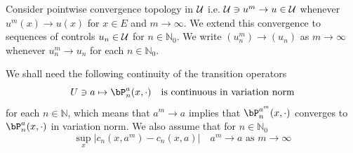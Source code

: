\documentclass[10pt,english]{extarticle}
\begin{document}
Consider pointwise convergence topology in ${\cal U}$ i.e. ${\cal U} \ni u^m \to u\in {\cal U}$ whenever $u^m(x)\to u(x)$ for $x\in E$ and $m\to \infty$. We extend this convergence to sequences of controls $u_n\in {\cal U}$ for $n\in \mathbb{N}_0$. We write $(u_n^m)\to (u_n)$ as $m\to \infty$ whenever
$u_n^m\to u_n$ for each $n\in  \mathbb{N}_0$.

We shall need the following continuity of the transition operators
\begin{equation}\label{varcont}
U\ni a \mapsto \bP_n^a(x,\cdot) \quad \mbox{is continuous in variation norm}
\end{equation}
for each $n\in \mathbb{N}$, which means that $a^m\to a$ implies that $\bP_n^{a^m}(x,\cdot)$ converges to $\bP_n^{a}(x,\cdot)$ in variation norm. We also assume that for $n\in \mathbb{N}_0$
\begin{equation}\label{ucontc}
\sup_x |c_n(x,a^m)-c_n(x,a)| \quad \mbox{$a^m \to a$ as $m\to \infty$}
\end{equation}
\end{document}
